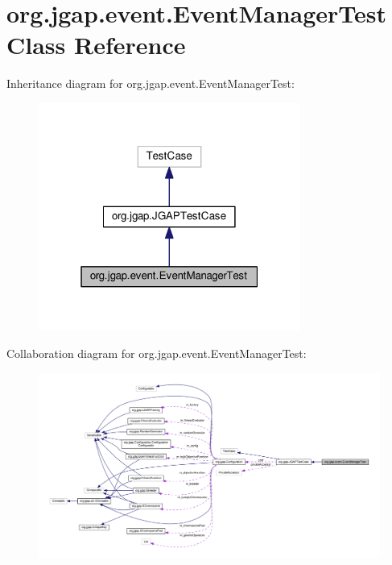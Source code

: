 \hypertarget{classorg_1_1jgap_1_1event_1_1_event_manager_test}{\section{org.\-jgap.\-event.\-Event\-Manager\-Test Class Reference}
\label{classorg_1_1jgap_1_1event_1_1_event_manager_test}
}


Inheritance diagram for org.\-jgap.\-event.\-Event\-Manager\-Test\-:
\nopagebreak
\begin{figure}[H]
\begin{center}
\leavevmode
\includegraphics[width=244pt]{classorg_1_1jgap_1_1event_1_1_event_manager_test__inherit__graph}
\end{center}
\end{figure}


Collaboration diagram for org.\-jgap.\-event.\-Event\-Manager\-Test\-:
\nopagebreak
\begin{figure}[H]
\begin{center}
\leavevmode
\includegraphics[width=350pt]{classorg_1_1jgap_1_1event_1_1_event_manager_test__coll__graph}
\end{center}
\end{figure}
